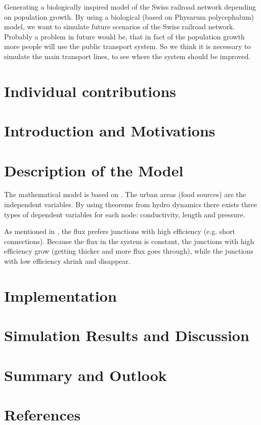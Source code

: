 \documentclass[11pt]{article}
\begin{document}
Generating a biologically inspired model of the Swiss railroad network depending on population growth. By using a biological (based on Physarum polycephalum) model, we want to simulate future scenarios of the Swiss railroad network. Probably a problem in future would be, that in fact of the population growth more people will use the public transport system. So we think it is necessary to simulate the main transport lines, to see where the system should be improved.




\section{Individual contributions}

\section{Introduction and Motivations}

\section{Description of the Model}

The mathematical model is based on \cite{network_model}. The urban areas (food sources) are the independent variables. By using theorems from hydro dynamics there exists three types of dependent variables for each node: conductivity, length and pressure.

As mentioned in \cite{network_model}, the flux prefers junctions with high efficiency (e.g. short connections). Because the flux in the system is constant, the junctions with high efficiency grow (getting thicker and more flux goes through), while the junctions with low efficiency shrink and disappear.


\section{Implementation}

\section{Simulation Results and Discussion}

\section{Summary and Outlook}

\section{References}



\end{document}
